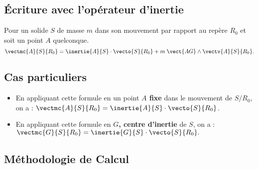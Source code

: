 \subsection{Écriture avec l'opérateur d'inertie}

\begin{prop}
Pour un solide $S$ de masse $m$ dans son mouvement par rapport au repère $R_0$ et soit un point $A$ quelconque.
$$\vectmc{A}{S}{R_0}=\inertie{A}{S}\cdot \vecto{S}{R_0}+m\;\vect{AG}\wedge \vectv{A}{S}{R_0}.
$$
\end{prop}



\subsection{Cas particuliers}

\begin{itemize}
\item En appliquant cette formule en un point \textbf{$A$ fixe} dans le mouvement de $S/R_0$, on a : $\vectmc{A}{S}{R_0}=\inertie{A}{S}\cdot \vecto{S}{R_0}$.
\item En appliquant cette formule en \textbf{$G$, centre d'inertie} de $S$, on a :
$
\vectmc{G}{S}{R_0}=\inertie{G}{S}\cdot \vecto{S}{R_0}.
$
\end{itemize}



\subsection{Méthodologie de Calcul}

